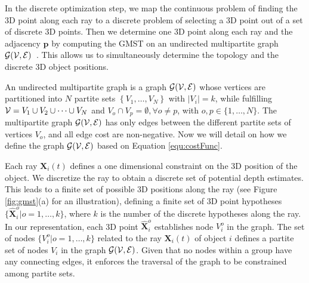 In the discrete optimization step, we map the continuous problem of finding the 3D point along each ray to a discrete problem of selecting a 3D point out of a set of discrete 3D points. Then we determine one 3D point along each ray and the adjacency $\mathbf{p}$ by computing the GMST on an undirected multipartite graph $\cal{G}(V,E)$~\cite{MyungLT_95}. This allows us to simultaneously  determine the topology and the discrete 3D object positions.

An undirected multipartite graph is a graph $\cal{G}(V,E)$ whose vertices are partitioned into $N$ partite sets $\left\{V_1, \dots, V_N\right\}$ with $\vert V_i \vert = k$, while fulfilling ${\cal V}=V_1 \cup V_2 \cup \dots \cup V_N$ and $V_o \cap V_p = \emptyset, \forall o\neq p$, with $o,p \in \{1, \dots, N \}$. The multipartite graph $\cal{G}(V,E)$ has only edges between the different partite sets  of vertices $V_o$, and all edge cost are non-negative. Now we will detail on how we define the graph $\cal{G}(V,E)$ based on Equation \ref{equ:costFunc}.

Each ray $\mathbf{X}_i(t)$ defines a one dimensional constraint on the 3D position of the object. We discretize the ray to obtain a discrete set of potential depth estimates. This leads to a finite set of possible 3D positions along the ray (see Figure \ref{fig:gmst}(a) for an illustration), defining a finite set of 3D point hypotheses %
$\{\mathbf{\hat{X}}_i^o|o=1,\dots,k \}$,
where $k$ is the number of the discrete hypotheses along the ray.
In our representation, each 3D point $\mathbf{\hat{X}}_i^o$ establishes node $V_i^o$ in the graph. The set of nodes $\{V_i^o|o=1, \dots, k\}$ related to the ray $\mathbf{X}_i(t)$ of object $i$ defines a partite set of nodes $V_i$ in the graph $\cal{G}(V,E)$. 
Given that no nodes within a group have any connecting edges, it enforces the traversal of the graph to be constrained among partite sets. 

